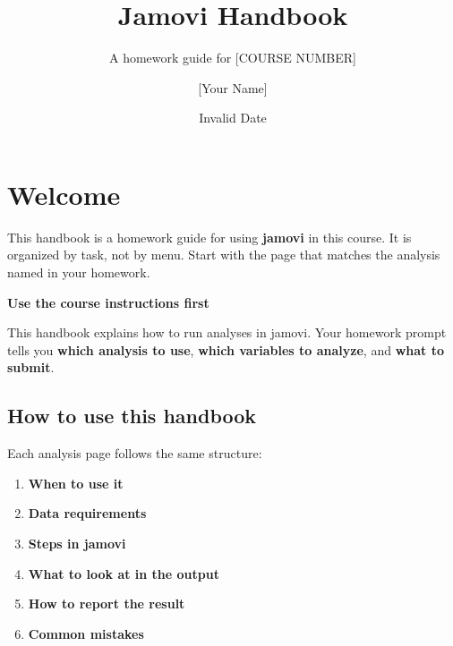 \documentclass[
  letterpaper,
  DIV=11,
  numbers=noendperiod]{scrreprt}
\title{Jamovi Handbook}
\subtitle{A homework guide for {[}COURSE NUMBER{]}}
\author{{[}Your Name{]}}
\date{Invalid Date}
\providecommand{\tightlist}{%
  \setlength{\itemsep}{0pt}\setlength{\parskip}{0pt}}
\renewcommand*\contentsname{Table of contents}
\newcommand\contentsname{Table of contents}
\begin{document}
\maketitle

\renewcommand*\contentsname{Table of contents}
{
\setcounter{tocdepth}{2}
\tableofcontents
}


\chapter*{Welcome}\label{welcome}


This handbook is a homework guide for using \textbf{jamovi} in this
course. It is organized by task, not by menu. Start with the page that
matches the analysis named in your homework.

\begin{tcolorbox}[enhanced jigsaw, arc=.35mm, bottomrule=.15mm, breakable, colback=white, colframe=quarto-callout-important-color-frame, left=2mm, leftrule=.75mm, opacityback=0, rightrule=.15mm, toprule=.15mm]
\begin{minipage}[t]{5.5mm}
\textcolor{quarto-callout-important-color}{\faExclamation}
\end{minipage}%
\begin{minipage}[t]{\textwidth - 5.5mm}

\vspace{-3mm}\textbf{Use the course instructions first}\vspace{3mm}

This handbook explains how to run analyses in jamovi. Your homework
prompt tells you \textbf{which analysis to use}, \textbf{which variables
to analyze}, and \textbf{what to submit}.

\end{minipage}%
\end{tcolorbox}

\section*{How to use this handbook}\label{how-to-use-this-handbook}


Each analysis page follows the same structure:

\begin{enumerate}
\def\labelenumi{\arabic{enumi}.}
\tightlist
\item
  \textbf{When to use it}
\item
  \textbf{Data requirements}
\item
  \textbf{Steps in jamovi}
\item
  \textbf{What to look at in the output}
\item
  \textbf{How to report the result}
\item
  \textbf{Common mistakes}
\end{enumerate}
\end{document}
